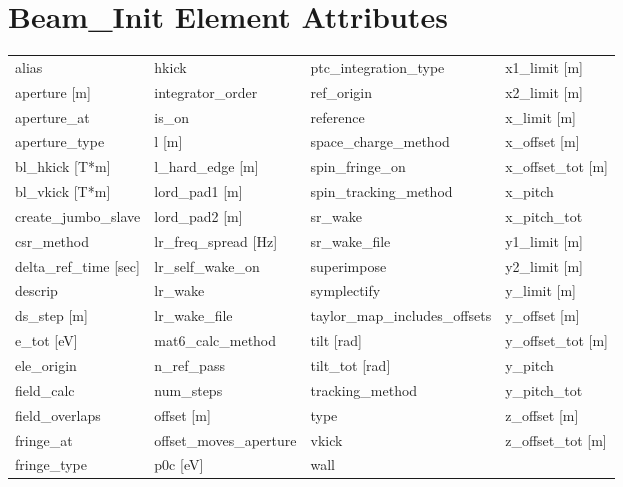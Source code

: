  \section{Beam_Init Element Attributes}
 \label{s:list.beam.init}
 
 \begin{tabular}{llll} \toprule
alias                          & hkick                          & ptc_integration_type           & x1_limit [m]                   \\
aperture [m]                   & integrator_order               & ref_origin                     & x2_limit [m]                   \\
aperture_at                    & is_on                          & reference                      & x_limit [m]                    \\
aperture_type                  & l [m]                          & space_charge_method            & x_offset [m]                   \\
bl_hkick [T*m]                 & l_hard_edge [m]                & spin_fringe_on                 & x_offset_tot [m]               \\
bl_vkick [T*m]                 & lord_pad1 [m]                  & spin_tracking_method           & x_pitch                        \\
create_jumbo_slave             & lord_pad2 [m]                  & sr_wake                        & x_pitch_tot                    \\
csr_method                     & lr_freq_spread [Hz]            & sr_wake_file                   & y1_limit [m]                   \\
delta_ref_time [sec]           & lr_self_wake_on                & superimpose                    & y2_limit [m]                   \\
descrip                        & lr_wake                        & symplectify                    & y_limit [m]                    \\
ds_step [m]                    & lr_wake_file                   & taylor_map_includes_offsets    & y_offset [m]                   \\
e_tot [eV]                     & mat6_calc_method               & tilt [rad]                     & y_offset_tot [m]               \\
ele_origin                     & n_ref_pass                     & tilt_tot [rad]                 & y_pitch                        \\
field_calc                     & num_steps                      & tracking_method                & y_pitch_tot                    \\
field_overlaps                 & offset [m]                     & type                           & z_offset [m]                   \\
fringe_at                      & offset_moves_aperture          & vkick                          & z_offset_tot [m]               \\
fringe_type                    & p0c [eV]                       & wall                           &                                \\
 \bottomrule
 \end{tabular}
